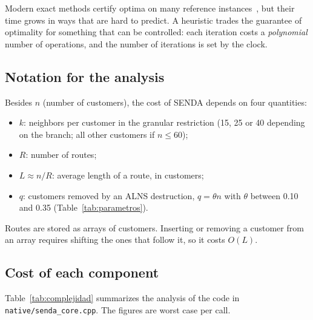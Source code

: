 \documentclass[11pt,a4paper]{article}
\newcommand{\tsl}[1]{\texttt{\small #1}}
\begin{document}
Modern exact methods certify optima on many reference instances~\cite{queiroga2021}, but their time
grows in ways that are hard to predict. A heuristic trades the guarantee of optimality for something
that can be controlled: each iteration costs a \emph{polynomial} number of operations, and the number
of iterations is set by the clock.

\subsection{Notation for the analysis}

Besides $n$ (number of customers), the cost of SENDA depends on four quantities:
\begin{itemize}[leftmargin=1.5em]
\item $k$: neighbors per customer in the granular restriction (15, 25 or 40 depending on the branch;
all other customers if $n\le60$);
\item $R$: number of routes;
\item $L\approx n/R$: average length of a route, in customers;
\item $q$: customers removed by an ALNS destruction, $q=\theta n$ with $\theta$ between 0.10 and 0.35
(Table~\ref{tab:parametros}).
\end{itemize}
Routes are stored as arrays of customers. Inserting or removing a customer from an array requires
shifting the ones that follow it, so it costs $O(L)$.

\subsection{Cost of each component}

Table~\ref{tab:complejidad} summarizes the analysis of the code in \tsl{native/senda\_core.cpp}. The
figures are worst case per call.
\end{document}
